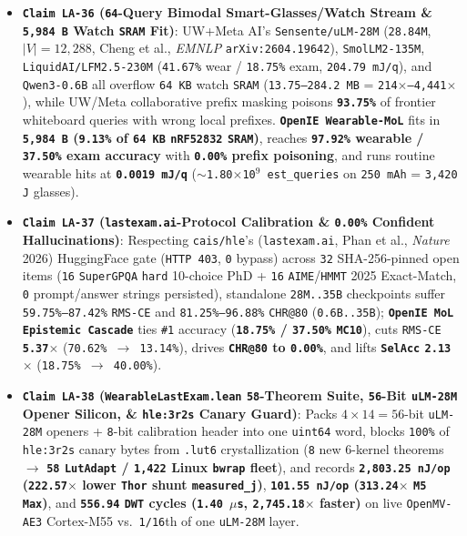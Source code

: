 \documentclass[10pt]{article}
\begin{document}
\begin{itemize}
  \item \textbf{\texttt{Claim LA-36} (\texttt{64}-Query Bimodal Smart-Glasses/Watch Stream \& \texttt{5,984 B} Watch \texttt{SRAM} Fit)}: UW+Meta AI's \texttt{Sensente/uLM-28M} (\texttt{28.84M}, $|V|=12{,}288$, Cheng et al., \emph{EMNLP} \texttt{arXiv:2604.19642}), \texttt{SmolLM2-135M}, \texttt{LiquidAI/LFM2.5-230M} (\texttt{41.67\%} wear / \texttt{18.75\%} exam, \texttt{204.79 mJ/q}), and \texttt{Qwen3-0.6B} all overflow \texttt{64 KB} watch \texttt{SRAM} (\texttt{13.75--284.2 MB} = \texttt{214$\times$--4,441$\times$}), while UW/Meta collaborative prefix masking poisons \textbf{\texttt{93.75\%}} of frontier whiteboard queries with wrong local prefixes. \textbf{\texttt{OpenIE Wearable-MoL}} fits in \textbf{\texttt{5,984 B} (\texttt{9.13\%} of \texttt{64 KB} \texttt{nRF52832} \texttt{SRAM})}, reaches \textbf{\texttt{97.92\%} wearable / \texttt{37.50\%} exam accuracy} with \textbf{\texttt{0.00\%} prefix poisoning}, and runs routine wearable hits at \textbf{\texttt{0.0019 mJ/q}} (\texttt{$\sim$1.80$\times$10$^9$ est\_queries} on \texttt{250 mAh} = \texttt{3,420 J} glasses).
  \item \textbf{\texttt{Claim LA-37} (\texttt{lastexam.ai}-Protocol Calibration \& \texttt{0.00\%} Confident Hallucinations)}: Respecting \texttt{cais/hle}'s (\texttt{lastexam.ai}, Phan et al., \emph{Nature} 2026) HuggingFace gate (\texttt{HTTP 403}, \texttt{0} bypass) across \texttt{32} SHA-256-pinned open items (\texttt{16} \texttt{SuperGPQA} \texttt{hard} 10-choice PhD + \texttt{16} \texttt{AIME}/\texttt{HMMT} 2025 Exact-Match, \texttt{0} prompt/answer strings persisted), standalone \texttt{28M..35B} checkpoints suffer \texttt{59.75\%--87.42\%} \texttt{RMS-CE} and \texttt{81.25\%--96.88\%} \texttt{CHR@80} (\texttt{0.6B..35B}); \textbf{\texttt{OpenIE MoL Epistemic Cascade}} ties \texttt{\#1} accuracy (\textbf{\texttt{18.75\%} / \texttt{37.50\%} \texttt{MC10}}), cuts \texttt{RMS-CE} \textbf{\texttt{5.37$\times$}} (\texttt{70.62\% $\to$ 13.14\%}), drives \textbf{\texttt{CHR@80} to \texttt{0.00\%}}, and lifts \textbf{\texttt{SelAcc} \texttt{2.13$\times$}} (\texttt{18.75\% $\to$ 40.00\%}).
  \item \textbf{\texttt{Claim LA-38} (\texttt{WearableLastExam.lean} \texttt{58}-Theorem Suite, \texttt{56}-Bit \texttt{uLM-28M} Opener Silicon, \& \texttt{hle:3r2s} Canary Guard)}: Packs $4 \times 14 = 56$-bit \texttt{uLM-28M} openers + \texttt{8}-bit calibration header into one \texttt{uint64} word, blocks \texttt{100\%} of \texttt{hle:3r2s} canary bytes from \texttt{.lut6} crystallization (\texttt{8} new 6-kernel theorems $\to$ \textbf{\texttt{58} \texttt{LutAdapt} / \texttt{1,422} Linux \texttt{bwrap} fleet}), and records \textbf{\texttt{2,803.25 nJ/op} (\texttt{222.57$\times$} lower \texttt{Thor} shunt \texttt{measured\_j})}, \textbf{\texttt{101.55 nJ/op} (\texttt{313.24$\times$} \texttt{M5 Max})}, and \textbf{\texttt{556.94} \texttt{DWT} cycles (\texttt{1.40 $\mu$s}, \texttt{2,745.18$\times$} faster)} on live \texttt{OpenMV-AE3} Cortex-M55 vs.\ \texttt{1/16}th of one \texttt{uLM-28M} layer.
\end{itemize}
\end{document}

